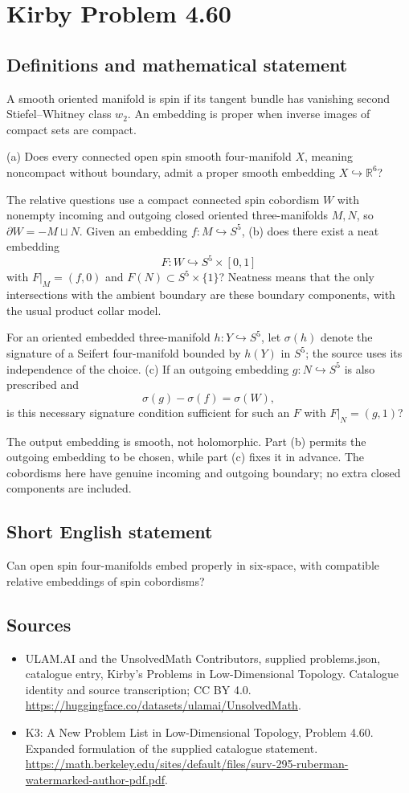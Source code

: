 \documentclass[11pt,a4paper]{article}
\begin{document}
\section*{Kirby Problem 4.60}\label{statement}

\subsection{Definitions and mathematical statement}
A smooth oriented manifold is spin if its tangent bundle has vanishing second Stiefel--Whitney class $w_2$. An embedding is proper when inverse images of compact sets are compact.

(a) Does every connected open spin smooth four-manifold $X$, meaning noncompact without boundary, admit a proper smooth embedding $X\hookrightarrow\mathbb R^6$?

The relative questions use a compact connected spin cobordism $W$ with nonempty incoming and outgoing closed oriented three-manifolds $M,N$, so $\partial W=-M\sqcup N$. Given an embedding $f:M\hookrightarrow S^5$, (b) does there exist a neat embedding
\[
F:W\hookrightarrow S^5\times[0,1]
\]
with $F|_M=(f,0)$ and $F(N)\subset S^5\times\{1\}$? Neatness means that the only intersections with the ambient boundary are these boundary components, with the usual product collar model.

For an oriented embedded three-manifold $h:Y\hookrightarrow S^5$, let $\sigma(h)$ denote the signature of a Seifert four-manifold bounded by $h(Y)$ in $S^5$; the source uses its independence of the choice. (c) If an outgoing embedding $g:N\hookrightarrow S^5$ is also prescribed and
\[
\sigma(g)-\sigma(f)=\sigma(W),
\]
is this necessary signature condition sufficient for such an $F$ with $F|_N=(g,1)$?

The output embedding is smooth, not holomorphic. Part (b) permits the outgoing embedding to be chosen, while part (c) fixes it in advance. The cobordisms here have genuine incoming and outgoing boundary; no extra closed components are included.
\subsection{Short English statement}
Can open spin four-manifolds embed properly in six-space, with compatible relative embeddings of spin cobordisms?
\subsection{Sources}
\begin{itemize}
\item[S1] ULAM.AI and the UnsolvedMath Contributors, supplied problems.json, catalogue entry, Kirby's Problems in Low-Dimensional Topology. Catalogue identity and source transcription; CC BY 4.0.
\url{https://huggingface.co/datasets/ulamai/UnsolvedMath}.
\item[S2] K3: A New Problem List in Low-Dimensional Topology, Problem 4.60. Expanded formulation of the supplied catalogue statement.
\url{https://math.berkeley.edu/sites/default/files/surv-295-ruberman-watermarked-author-pdf.pdf}.
\end{itemize}
\end{document}
